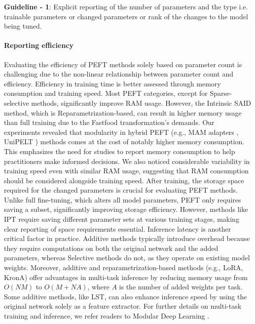 \begin{tcolorbox}[
    colback=gray!05,  
    colframe=black!50, boxrule=0.5pt, arc=3mm,           
    width=\linewidth,  
    leftrule=0.1mm, rightrule=0.1mm, bottomrule=0.1mm, toprule=0.1mm, ]
\textbf{Guideline - 1}: Explicit reporting of the number of parameters and the type i.e. trainable parameters or changed parameters or rank of the changes to the model being tuned.
\end{tcolorbox}

\paragraph{Reporting efficiency} Evaluating the efficiency of PEFT methods solely based on parameter count is challenging due to the non-linear relationship between parameter count and efficiency. Efficiency in training time is better assessed through memory consumption and training speed. Most PEFT categories, except for Sparse-selective methods, significantly improve RAM usage. However, the Intrinsic SAID \citep{intrinsic_said} method, which is Reparametrization-based, can result in higher memory usage than full training due to the Fastfood transformation's demands. Our experiments revealed that modularity in hybrid PEFT (e.g., MAM adapters \citep{}, UniPELT \citep{unipelt}) methods comes at the cost of notably higher memory consumption. This emphasizes the need for studies to report memory consumption to help practitioners make informed decisions. We also noticed considerable variability in training speed even with similar RAM usage, suggesting that RAM consumption should be considered alongside training speed. After training, the storage space required for the changed parameters is crucial for evaluating PEFT methods. Unlike full fine-tuning, which alters all model parameters, PEFT only requires saving a subset, significantly improving storage efficiency. However, methods like IPT require saving different parameter sets at various training stages, making clear reporting of space requirements essential. Inference latency is another critical factor in practice. Additive methods typically introduce overhead because they require computations on both the original network and the added parameters, whereas Selective methods do not, as they operate on existing model weights. Moreover, additive and reparametrization-based methods (e.g., LoRA, KronA) offer advantages in multi-task inference by reducing memory usage from $O(NM)$ to $O(M + NA)$, where $A$ is the number of added weights per task. Some additive methods, like LST, can also enhance inference speed by using the original network solely as a feature extractor. For further details on multi-task training and inference, we refer readers to Modular Deep Learning \citep{modular_deep_learning}.

